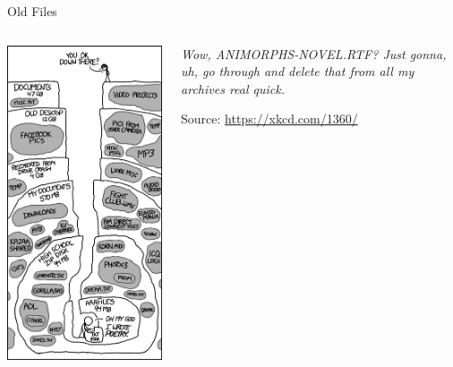 \begin{frame}{Old Files}
%
\begin{columns}[T]
\includegraphics[width=\linewidth]{./gfx/14-xkcd-old-files}
%
\begin{center}
\emph{Wow, ANIMORPHS-NOVEL.RTF? Just gonna, uh, go through and delete that from all my archives real quick.}

\vspace{12pt}
Source: \url{https://xkcd.com/1360/}
\end{center}
\end{columns}
%
\end{frame}

